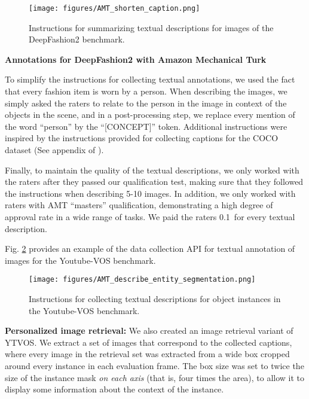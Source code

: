 \documentclass[runningheads]{llncs}
\newcommand{\figref}[1]{Fig. \ref{#1}}
\newcommand{\concept}{[CONCEPT]}
\begin{document}
\begin{figure}[htbp]
    \centering
    \texttt{[image: figures/AMT\_shorten\_caption.png]} \hspace{-10pt}
    \vspace{-10pt}
    \caption{
Instructions for summarizing textual descriptions for images of the DeepFashion2 benchmark.
}
    \label{fig_AMT_shorten_caption}
    \vspace{-5pt}
\end{figure}

\vspace{5pt}\noindent\textbf{Annotations for DeepFashion2 with Amazon Mechanical Turk}

To simplify the instructions for collecting textual annotations, we used the fact that every fashion item is worn by a person.
When describing the images, we simply asked the raters to relate to the person in the image in context of the objects in the scene, and in a post-processing step, we replace every mention of the word ``person'' by the ``\concept{}'' token. Additional instructions were inspired by the instructions provided for collecting captions for the COCO dataset (See appendix of \cite{lin2014microsoft}).

Finally, to maintain the quality of the textual descriptions, we only worked with the raters after they passed our qualification test, making sure that they followed the instructions when describing 5-10 images. In addition, we only worked with raters with AMT ``masters'' qualification, demonstrating a high degree of approval rate in a wide range of tasks. We paid the raters 0.1\ for every textual description.

\figref{fig_AMT_describe_entity_segmentation} provides an example of the data collection API for textual annotation of images for the Youtube-VOS benchmark.


\begin{figure}[h]
    \centering
    \texttt{[image: figures/AMT\_describe\_entity\_segmentation.png]} \hspace{-10pt}
    \vspace{-10pt}
    \caption{
Instructions for collecting textual descriptions for object instances in the Youtube-VOS benchmark.
    }
    \label{fig_AMT_describe_entity_segmentation}
    \vspace{-5pt}
\end{figure}


\vspace{5pt}\noindent\textbf{Personalized image retrieval:}
We also created an image retrieval variant of YTVOS. We extract a set of images that correspond to the collected captions, where every image in the retrieval set was extracted from a wide box cropped around every instance in each evaluation frame. The box size was set to twice the size of the instance mask \textit{on each axis} (that is, four times the area), to allow it to display some information about the context of the instance.



\clearpage{}
\end{document}
